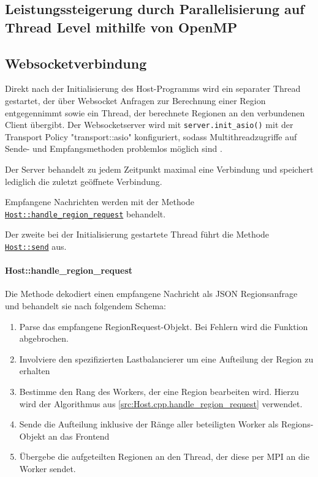 \subsection{Leistungssteigerung durch Parallelisierung auf Thread Level mithilfe von OpenMP}

\subsection{Websocketverbindung}\label{cls:Host}

Direkt nach der Initialisierung des Host-Programms wird ein separater Thread gestartet, der über Websocket
Anfragen zur Berechnung einer Region entgegennimmt sowie ein Thread, der berechnete Regionen an den verbundenen Client übergibt.
Der Websocketserver wird mit \verb|server.init_asio()| mit der Transport Policy "transport::asio"
konfiguriert, sodass Multithreadzugriffe auf Sende- und Empfangsmethoden problemlos möglich sind \cite{websocketppManual}.

Der Server behandelt zu jedem Zeitpunkt maximal eine Verbindung und speichert lediglich die zuletzt geöffnete Verbindung.

Empfangene Nachrichten werden mit der Methode \hyperref[cls:Host::handle_region_request]{\texttt{Host::handle\_region\_request}} behandelt.

Der zweite bei der Initialisierung gestartete Thread führt die Methode \hyperref[cls:Host::send]{\texttt{Host::send}} aus.

\paragraph{Host::handle\_region\_request}\label{cls:Host::handle_region_request}

Die Methode dekodiert einen empfangene Nachricht als JSON Regionsanfrage und behandelt sie nach folgendem Schema:

\begin{enumerate}
	\item Parse das empfangene RegionRequest-Objekt. Bei Fehlern wird die Funktion abgebrochen.
	\item Involviere den spezifizierten Lastbalancierer um eine Aufteilung der Region zu erhalten
	\item Bestimme den Rang des Workers, der eine Region bearbeiten wird. Hierzu wird der Algorithmus aus \autoref{src:Host.cpp.handle_region_request} verwendet.
	\item Sende die Aufteilung inklusive der Ränge aller beteiligten Worker als Regions-Objekt an das Frontend
	\item Übergebe die aufgeteilten Regionen an den Thread, der diese per MPI an die Worker sendet.
\end{enumerate}

